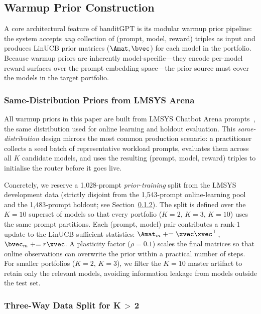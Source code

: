 \subsection{Warmup Prior Construction}
\label{sec:warmup_prior_construction}

A core architectural feature of banditGPT is its modular warmup prior pipeline: the system accepts \emph{any} collection of (prompt, model, reward) triples as input and produces LinUCB prior matrices ($\Amat, \bvec$) for each model in the portfolio.
Because warmup priors are inherently model-specific---they encode per-model reward surfaces over the prompt embedding space---the prior source must cover the models in the target portfolio.

\subsubsection{Same-Distribution Priors from LMSYS Arena}

All warmup priors in this paper are built from LMSYS Chatbot Arena prompts~\cite{zheng2023judging}, the same distribution used for online learning and holdout evaluation.
This \emph{same-distribution} design mirrors the most common production scenario: a practitioner collects a seed batch of representative workload prompts, evaluates them across all $K$ candidate models, and uses the resulting (prompt, model, reward) triples to initialise the router before it goes live.

Concretely, we reserve a 1{,}028-prompt \emph{prior-training} split from the LMSYS development data (strictly disjoint from the 1{,}543-prompt online-learning pool and the 1{,}483-prompt holdout; see Section~\ref{sec:three_way_split}).
The split is defined over the $K{=}10$ superset of models so that every portfolio ($K{=}2$, $K{=}3$, $K{=}10$) uses the same prompt partitions.
Each (prompt, model) pair contributes a rank-1 update to the LinUCB sufficient statistics: $\Amat_m \mathrel{+}= \xvec\xvec^\top$, $\bvec_m \mathrel{+}= r\xvec$.
A plasticity factor ($\rho{=}0.1$) scales the final matrices so that online observations can overwrite the prior within a practical number of steps.
For smaller portfolios ($K{=}2$, $K{=}3$), we filter the $K{=}10$ master artifact to retain only the relevant models, avoiding information leakage from models outside the test set.

\subsubsection{Three-Way Data Split for K\,$>$\,2}
\label{sec:three_way_split}


